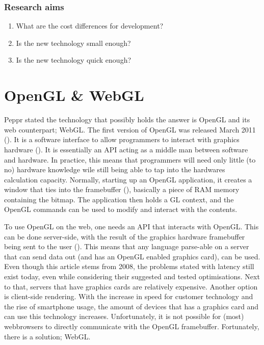 \subsubsection{Research aims}
\begin{enumerate}
	\item {What are the cost differences for development?}
	\item {Is the new technology small enough?}
	\item {Is the new technology quick enough?}
\end{enumerate}


\clearpage
\section{OpenGL \& WebGL}
Peppr stated the technology that possibly holds the answer is OpenGL and its web counterpart; WebGL.
The first version of OpenGL was released March 2011 (\cite{openGLsite}). It is a software interface to allow programmers to interact with graphics hardware (\cite{openGLSpecification}). It is essentially an API acting as a middle man between software and hardware. In practice, this means that programmers will need only little (to no) hardware knowledge wile still being able to tap into the hardwares calculation capacity. Normally, starting up an OpenGL application, it creates a window that ties into the framebuffer (\cite{framebuffer}), basically a piece of RAM memory containing the bitmap. The application then holds a GL context, and the OpenGL commands can be used to modify and interact with the contents.

To use OpenGL on the web, one needs an API that interacts with OpenGL. This can be done server-side, with the result of the graphics hardware framebuffer being sent to the user (\cite{CRRS}). This means that any language parse-able on a server that can send data out (and has an OpenGL enabled graphics card), can be used. Even though this article stems from 2008, the problems stated with latency still exist today, even while considering their suggested and tested optimisations. Next to that, servers that have graphics cards are relatively expensive. Another option is client-side rendering. With the increase in speed for customer technology and the rise of smartphone usage, the amount of devices that has a graphics card and can use this technology increases. Unfortunately, it is not possible for (most) webbrowsers to directly communicate with the OpenGL framebuffer. Fortunately, there is a solution; WebGL.

